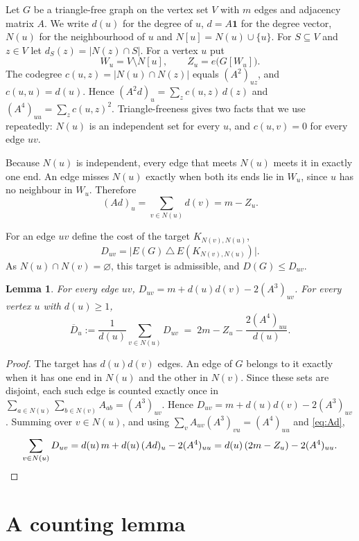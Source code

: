 \documentclass[11pt]{article}
\newtheorem{lemma}[theorem]{Lemma}
\theoremstyle{remark}
\newcommand{\Dcost}{D}
\begin{document}
Let $G$ be a triangle-free graph on the vertex set $V$ with $m$ edges and adjacency matrix $A$.
We write $d(u)$ for the degree of $u$, $d=A\mathbf 1$ for the degree vector, $N(u)$ for the
neighbourhood of $u$ and $N[u]=N(u)\cup\{u\}$. For $S\subseteq V$ and $z\in V$ let
$d_S(z)=|N(z)\cap S|$. For a vertex $u$ put
\[
  W_u=V\setminus N[u],\qquad Z_u=e\bigl(G[W_u]\bigr).
\]
The codegree $c(u,z)=|N(u)\cap N(z)|$ equals $(A^2)_{uz}$, and $c(u,u)=d(u)$. Hence
$(A^2d)_u=\sum_z c(u,z)\,d(z)$ and $(A^4)_{uu}=\sum_z c(u,z)^2$. Triangle-freeness gives two
facts that we use repeatedly: $N(u)$ is an independent set for every $u$, and $c(u,v)=0$ for every
edge $uv$.

Because $N(u)$ is independent, every edge that meets $N(u)$ meets it in exactly one end. An edge
misses $N(u)$ exactly when both its ends lie in $W_u$, since $u$ has no neighbour in $W_u$.
Therefore
\begin{equation}\label{eq:Ad}
  (Ad)_u=\sum_{v\in N(u)}d(v)=m-Z_u .
\end{equation}

For an edge $uv$ define the cost of the target $K_{N(v),N(u)}$,
\[
  \Dcost_{uv}=\bigl|E(G)\,\triangle\,E(K_{N(v),N(u)})\bigr| .
\]
As $N(u)\cap N(v)=\varnothing$, this target is admissible, and $D(G)\le \Dcost_{uv}$.

\begin{lemma}\label{lem:cost}
For every edge $uv$, $\Dcost_{uv}=m+d(u)d(v)-2(A^3)_{uv}$. For every vertex $u$ with $d(u)\ge1$,
\begin{equation}\label{eq:mean}
  \overline\Dcost_u:=\frac{1}{d(u)}\sum_{v\in N(u)}\Dcost_{uv}
  \;=\;2m-Z_u-\frac{2(A^4)_{uu}}{d(u)} .
\end{equation}
\end{lemma}

\begin{proof}
The target has $d(u)d(v)$ edges. An edge of $G$ belongs to it exactly when it has one end in
$N(u)$ and the other in $N(v)$. Since these sets are disjoint, each such edge is counted exactly
once in $\sum_{a\in N(u)}\sum_{b\in N(v)}A_{ab}=(A^3)_{uv}$. Hence
$\Dcost_{uv}=m+d(u)d(v)-2(A^3)_{uv}$. Summing over $v\in N(u)$, and using
$\sum_{v}A_{uv}(A^3)_{vu}=(A^4)_{uu}$ and \eqref{eq:Ad},
\[
  \sum_{v\in N(u)}\Dcost_{uv}=d(u)\,m+d(u)\,(Ad)_u-2(A^4)_{uu}
  =d(u)\,(2m-Z_u)-2(A^4)_{uu} .\qedhere
\]
\end{proof}

\section{A counting lemma}
\end{document}
